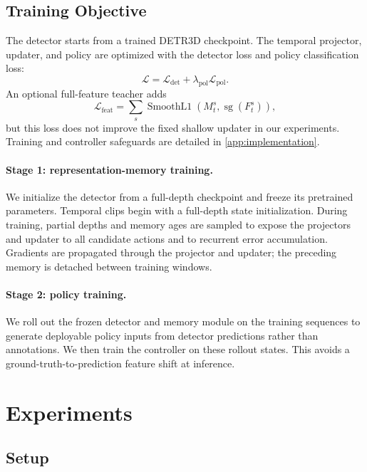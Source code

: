 \documentclass[10pt,twocolumn,letterpaper]{article}
\begin{document}
\subsection{Training Objective}

The detector starts from a trained DETR3D checkpoint. The temporal projector, updater, and policy are optimized with the detector loss and policy classification loss:
\begin{equation}
\mathcal{L}=\mathcal{L}_{\mathrm{det}}+\lambda_{\mathrm{pol}}\mathcal{L}_{\mathrm{pol}}.
\end{equation}
An optional full-feature teacher adds
\begin{equation}
\mathcal{L}_{\mathrm{feat}}=\sum_s \operatorname{SmoothL1}\left(M_t^s,\operatorname{sg}(F_t^s)\right),
\end{equation}
but this loss does not improve the fixed shallow updater in our experiments. Training and controller safeguards are detailed in \cref{app:implementation}.



\paragraph{Stage 1: representation-memory training.}
We initialize the detector from a full-depth checkpoint and freeze
its pretrained parameters. Temporal clips begin with a full-depth
state initialization. During training, partial depths and memory ages
are sampled to expose the projectors and updater to all candidate
actions and to recurrent error accumulation. Gradients are propagated
through the projector and updater; the preceding memory is detached
between training windows.

\paragraph{Stage 2: policy training.}
We roll out the frozen detector and memory module on the training sequences to generate deployable policy inputs from detector
predictions rather than annotations.
We then train the controller on these rollout states. This avoids a ground-truth-to-prediction feature shift at inference.


\section{Experiments}
\label{sec:experiments}

\subsection{Setup}
\end{document}
